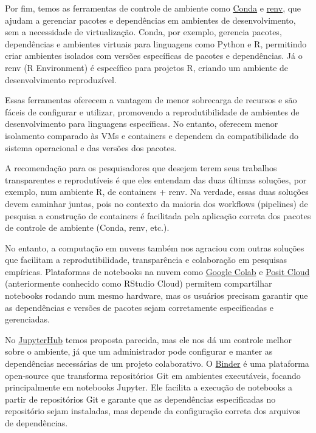 \documentclass[
  a4paper,
]{article}
\begin{document}
Por fim, temos as ferramentas de controle de ambiente como
\href{https://docs.conda.io/projects/conda/en/stable/}{Conda} e
\href{https://rstudio.github.io/renv/articles/renv.html}{renv}, que
ajudam a gerenciar pacotes e dependências em ambientes de
desenvolvimento, sem a necessidade de virtualização. Conda, por exemplo,
gerencia pacotes, dependências e ambientes virtuais para linguagens como
Python e R, permitindo criar ambientes isolados com versões específicas
de pacotes e dependências. Já o renv (R Environment) é específico para
projetos R, criando um ambiente de desenvolvimento reproduzível.

Essas ferramentas oferecem a vantagem de menor sobrecarga de recursos e
são fáceis de configurar e utilizar, promovendo a reprodutibilidade de
ambientes de desenvolvimento para linguagens específicas. No entanto,
oferecem menor isolamento comparado às VMs e containers e dependem da
compatibilidade do sistema operacional e das versões dos pacotes.

A recomendação para os pesquisadores que desejem terem seus trabalhos
transparentes e reprodutíveis é que eles entendam das duas últimas
soluções, por exemplo, num ambiente R, de containers + renv. Na verdade,
essas duas soluções devem caminhar juntas, pois no contexto da maioria
dos workflows (pipelines) de pesquisa a construção de containers é
facilitada pela aplicação correta dos pacotes de controle de ambiente
(Conda, renv, etc.).

No entanto, a computação em nuvens também nos agraciou com outras
soluções que facilitam a reprodutibilidade, transparência e colaboração
em pesquisas empíricas. Plataformas de notebooks na nuvem como
\href{https://colab.research.google.com/}{Google Colab} e
\href{https://posit.cloud/}{Posit Cloud} (anteriormente conhecido como
RStudio Cloud) permitem compartilhar notebooks rodando num mesmo
hardware, mas os usuários precisam garantir que as dependências e
versões de pacotes sejam corretamente especificadas e gerenciadas.

No \href{https://jupyter.org/hub}{JupyterHub} temos proposta parecida,
mas ele nos dá um controle melhor sobre o ambiente, já que um
administrador pode configurar e manter as dependências necessárias de um
projeto colaborativo. O \href{https://mybinder.org/}{Binder} é uma
plataforma open-source que transforma repositórios Git em ambientes
executáveis, focando principalmente em notebooks Jupyter. Ele facilita a
execução de notebooks a partir de repositórios Git e garante que as
dependências especificadas no repositório sejam instaladas, mas depende
da configuração correta dos arquivos de dependências.
\end{document}
